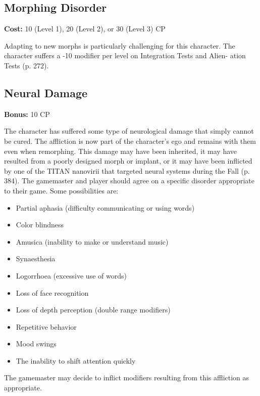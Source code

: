 \subsection{Morphing Disorder} \label{sec:traits-morphing-disorder} 

\textbf{Cost:} 10 (Level 1), 20 (Level 2), or 30 (Level 3) CP 

Adapting to new morphs is particularly challenging for this character. The character suffers a -10 modifier per level on Integration Tests and Alien- ation Tests (p. 272). 

\subsection{Neural Damage} \label{sec:traits-neural-damage} 

\textbf{Bonus:} 10 CP 

The character has suffered some type of neurological damage that simply cannot be cured. The affliction is now part of the character’s ego and remains with them even when remorphing. This damage may have been inherited, it may have resulted from a poorly designed morph or implant, or it may have been inflicted by one of the TITAN nanovirii that targeted neural systems during the Fall (p. 384). The gamemaster and player should agree on a specific disorder appropriate to their game. Some possibilities are: 

\begin{itemize} \item Partial aphasia (difficulty communicating or using words) \item Color blindness \item Amusica (inability to make or understand music) \item Synaesthesia \item Logorrhoea (excessive use of words) \item Loss of face recognition \item Loss of depth perception (double range modifiers) \item Repetitive behavior \item Mood swings \item The inability to shift attention quickly \end{itemize} 

The gamemaster may decide to inflict modifiers resulting from this affliction as appropriate. 





